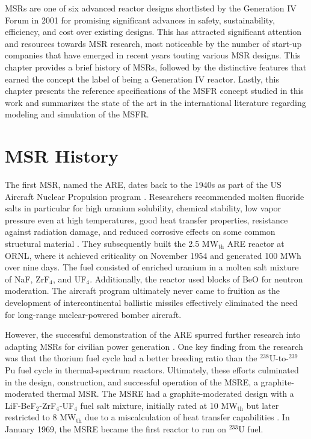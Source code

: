 \glspl{MSR} are one of six advanced reactor designs shortlisted by
the Generation IV Forum in 2001 for promising significant advances in safety,
sustainability, efficiency, and cost over existing designs. This
has attracted significant attention and resources towards
\gls{MSR} research, most noticeable by the number of start-up companies that
have emerged in recent years touting various \gls{MSR} designs. This chapter
provides a brief history of \glspl{MSR}, followed by the distinctive features
that earned the concept the label of being a Generation IV reactor. Lastly,
this chapter presents the reference specifications of the \gls{MSFR} concept
studied in this work and summarizes the state of the art in the international
literature regarding modeling and simulation of the \gls{MSFR}.

\section{\gls{MSR} History}

The first \gls{MSR}, named the \gls{ARE}, dates back to the 1940s
as part of the US Aircraft Nuclear Propulsion program
\cite{rosenthal_molten-salt_1970}. Researchers recommended molten fluoride
salts in particular for high uranium solubility, chemical stability, low vapor
pressure even at high temperatures, good heat transfer properties,
resistance against radiation damage, and reduced corrosive effects on some
common structural material \cite{rosenthal_molten-salt_1970}. They
subsequently built the 2.5 MW$_{\text{th}}$ ARE reactor at \gls{ORNL}, where
it achieved criticality on November 1954 and generated 100 MWh over nine days.
The fuel consisted of enriched uranium in a molten salt mixture of NaF,
ZrF$_4$, and UF$_4$. Additionally, the reactor used blocks of BeO for neutron
moderation. The aircraft program
ultimately never came to fruition as the development of intercontinental
ballistic missiles effectively eliminated the need for long-range
nuclear-powered bomber aircraft.

However, the successful demonstration of the \gls{ARE} spurred further
research into adapting \glspl{MSR} for civilian power generation
\cite{rosenthal_molten-salt_1970}. One key finding from the
research was that the thorium fuel cycle had a better breeding ratio than the
$^{238}$U-to-$^{239}$Pu fuel cycle in thermal-spectrum reactors.
Ultimately, these efforts culminated in the design, construction, and
successful operation of the \gls{MSRE}, a graphite-moderated thermal
\gls{MSR}. The \gls{MSRE} had a
graphite-moderated design with a LiF-BeF$_2$-ZrF$_4$-UF$_4$ fuel salt mixture,
initially rated at 10 MW$_{\text{th}}$ but later restricted to 8
MW$_{\text{th}}$ due to a miscalculation of heat transfer capabilities
\cite{haubenreich_experience_1970}. In January 1969, the \gls{MSRE} became the
first reactor to run on $^{233}$U fuel.

